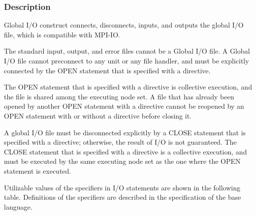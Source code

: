 

   \subsubsection*{Description}

   Global I/O construct connects, disconnects, inputs, and outputs the
   global I/O file, which is compatible with MPI-IO.

   The standard input, output, and error files cannot be a Global I/O file.
   A Global I/O file cannot preconnect to any unit or any file handler,
   and must be explicitly connected by the OPEN statement that is
   specified with a \gio directive.

   The OPEN statement that is specified with a \gio directive is
   collective execution, and the file is shared among the executing node 
   set.
   A file that has already been opened by another OPEN statement with
   a \gio directive cannot be reopened by an OPEN statement with or
   without a \gio directive before closing it.

   A global I/O file must be disconnected explicitly by a CLOSE
   statement that is specified with a \gio directive; otherwise, the
   result of I/O is not guaranteed.
   The CLOSE statement that is specified with a \gio directive is a
   collective execution, and must be executed by the same executing 
   node set as the one where the OPEN statement is executed.

   Utilizable values of the specifiers in I/O statements are shown in the
   following table.
   Definitions of the specifiers are described in the specification of
   the base language.

